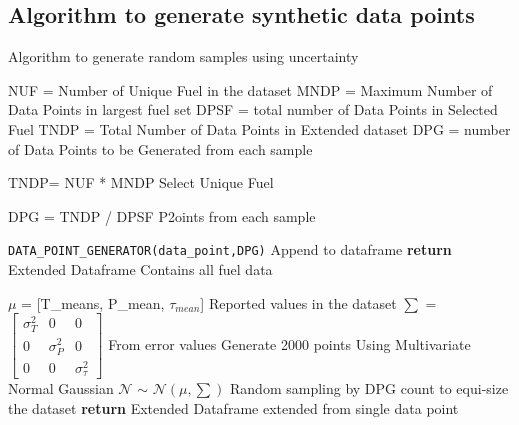 \documentclass[preprint,12pt]{elsarticle}
\begin{document}
			\subsection{Algorithm to generate synthetic data points }
				
			
				
				\begin{algorithm}
					\caption{Algorithm to generate random samples using uncertainty}\label{alg:sample}
					\begin{algorithmic}[1]
						\State NUF = Number of Unique Fuel in the dataset
						\State MNDP = Maximum Number of Data Points in largest fuel set
						\State  DPSF = total number of Data Points in Selected Fuel 
						\State TNDP = Total Number of Data Points in Extended dataset
						\State DPG = number of Data Points to be Generated from each sample   
						\\\hrulefill
						
						\State TNDP= NUF * MNDP  
						  \Comment Select Unique Fuel 
						 
						\State  DPG = TNDP / DPSF  \Comment P2oints from each sample 
						 
						  \State  \texttt{DATA_POINT_GENERATOR(data_point,DPG)} \Comment Append to dataframe 
						  \EndFor
						 \EndFor 						  
						 \State \textbf{return} Extended Dataframe \Comment Contains all fuel data
						\vspace{0.2cm}
						
							\State ${\mu}$  = [T_means, P_mean, $\tau_{mean}$] \Comment Reported values in the dataset
							\State ${\sum}$ = $\begin{bmatrix}
									\sigma_T^2& 0 & 0\\
									0 &\sigma_P^2 & 0\\
									0 & 0 &\sigma_{\tau}^2
							\end{bmatrix}$ \Comment From error values 
							\State Generate 2000 points Using Multivariate Normal Gaussian $\mathcal{N}$ $\sim$ $\mathcal{N}(\mu,\sum)$
							\State Random sampling by DPG count \Comment to equi-size the dataset 
						\State \textbf{return} Extended Dataframe \Comment extended from single data point 
						\EndProcedure
						
					
					\end{algorithmic}
				\end{algorithm}
				
\end{document}
